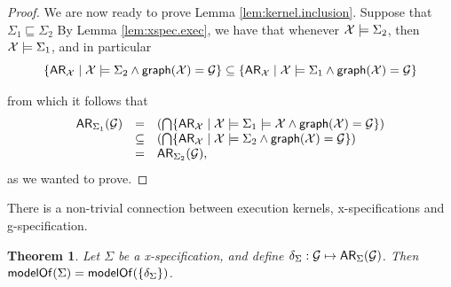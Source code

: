 \documentclass[a4paper,UKenglish]{article}%
\newtheorem{theorem}{Theorem}
\theoremstyle{plain}
\begin{document}
\begin{proof}
We are now ready to prove Lemma \ref{lem:kernel.inclusion}. Suppose that $\Sigma_1 \sqsubseteq \Sigma_2$
By Lemma \ref{lem:xspec.exec}, we have that whenever $\mathcal{X} \models \Sigma_2$, then $\mathcal{X} \models \Sigma_1$, 
and in particular 
\[
\{{\sf{AR}}_{\mathcal{X}} \mid \mathcal{X} \models \Sigma_2 \wedge \mathsf{graph}(\mathcal{X}) = \mathcal{G} \} \subseteq 
\{{\sf{AR}}_{\mathcal{X}} \mid \mathcal{X} \models \Sigma_1 \wedge \mathsf{graph}(\mathcal{X}) = \mathcal{G} \}
\]

from which it follows that  
\[
\begin{array}{lcl}
{\sf{AR}}_{\Sigma_1}(\mathcal{G}) &=& \left( \bigcap \{ {\sf{AR}}_{\mathcal{X}} \mid \mathcal{X} \models \Sigma_1 \models \mathcal{X} \wedge \mathsf{graph}(\mathcal{X}) = \mathcal{G} \} \right)\\
&\subseteq& \left( \bigcap \{{\sf{AR}}_{\mathcal{X}} \mid \mathcal{X} \models \Sigma_2 \wedge \mathsf{graph}(\mathcal{X}) = \mathcal{G} \} \right)\\ 
&=& {\sf{AR}}_{\Sigma_2}(\mathcal{G}),
\end{array}
\]
as we wanted to prove.
\end{proof}

There is a non-trivial connection between execution kernels, x-specifications and g-specification. 
\begin{theorem}
\label{thm:kernel}
Let $\Sigma$ be a x-specification, and define $\delta_{\Sigma} : \mathcal{G} \mapsto {\sf{AR}}_{\Sigma}(\mathcal{G})$. 
Then $\mathsf{modelOf}(\Sigma) = \mathsf{modelOf}(\{\delta_{\Sigma}\})$.
\end{theorem}
\end{document}
